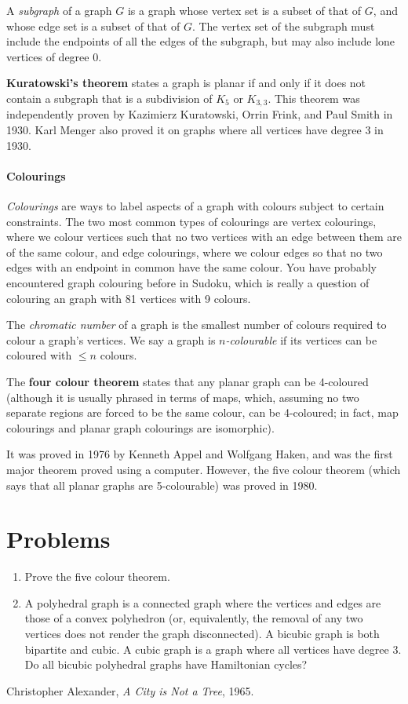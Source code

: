 \documentclass{article}
\begin{document}
	A \textit{subgraph} of a graph \(G\) is a graph whose vertex set is a subset of that of \(G\), and whose edge set is a subset of that of \(G\). The vertex set of the subgraph must include the endpoints of all the edges of the subgraph, but may also include lone vertices of degree 0.
	
	\textbf{Kuratowski's theorem} states a graph is planar if and only if it does not contain a subgraph that is a subdivision of \(K_5\) or \(K_{3,3}\). This theorem was independently proven by Kazimierz Kuratowski, Orrin Frink, and Paul Smith in 1930. Karl Menger also proved it on graphs where all vertices have degree 3 in 1930.
	
	\paragraph{Colourings}
	
	\textit{Colourings} are ways to label aspects of a graph with colours subject to certain constraints. The two most common types of colourings are vertex colourings, where we colour vertices such that no two vertices with an edge between them are of the same colour, and edge colourings, where we colour edges so that no two edges with an endpoint in common have the same colour. You have probably encountered graph colouring before in Sudoku, which is really a question of colouring an graph with 81 vertices with 9 colours.
	
	The \textit{chromatic number} of a graph is the smallest number of colours required to colour a graph's vertices. We say a graph is \textit{\(n\)-colourable} if its vertices can be coloured with \(\leq{}n\) colours.
	
	The \textbf{four colour theorem} states that any planar graph can be 4-coloured (although it is usually phrased in terms of maps, which, assuming no two separate regions are forced to be the same colour, can be 4-coloured; in fact, map colourings and planar graph colourings are isomorphic).
	
	It was proved in 1976 by Kenneth Appel and Wolfgang Haken, and was the first major theorem proved using a computer. However, the five colour theorem (which says that all planar graphs are 5-colourable) was proved in 1980.
	
	\section{Problems}
	
	\begin{enumerate}
		\item Prove the five colour theorem.
		\item A polyhedral graph is a connected graph where the vertices and edges are those of a convex polyhedron (or, equivalently, the removal of any two vertices does not render the graph disconnected). A bicubic graph is both bipartite and cubic. A cubic graph is a graph where all vertices have degree 3. Do all bicubic polyhedral graphs have Hamiltonian cycles?
	\end{enumerate}
		
	\begin{thebibliography}{9}
		Christopher Alexander,
		\textit{A City is Not a Tree},
		1965.
	\end{thebibliography}
	
\end{document}
